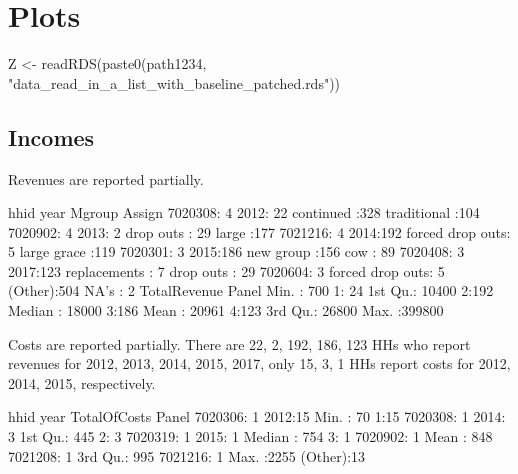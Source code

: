 \section{Plots}

\begin{Schunk}
\begin{Sinput}
Z <- readRDS(paste0(path1234, "data_read_in_a_list_with_baseline_patched.rds"))
\end{Sinput}
\end{Schunk}

\subsection{Incomes}



Revenues are reported partially.
\begin{Schunk}
\begin{Soutput}
      hhid       year                  Mgroup                 Assign   
 7020308:  4   2012: 22   continued       :328   traditional     :104  
 7020902:  4   2013:  2   drop outs       : 29   large           :177  
 7021216:  4   2014:192   forced drop outs:  5   large grace     :119  
 7020301:  3   2015:186   new group       :156   cow             : 89  
 7020408:  3   2017:123   replacements    :  7   drop outs       : 29  
 7020604:  3                                     forced drop outs:  5  
 (Other):504                                     NA's            :  2  
  TotalRevenue    Panel  
 Min.   :   700   1: 24  
 1st Qu.: 10400   2:192  
 Median : 18000   3:186  
 Mean   : 20961   4:123  
 3rd Qu.: 26800          
 Max.   :399800          
                         
\end{Soutput}
\end{Schunk}
Costs are reported partially. There are 22, 2, 192, 186, 123 HHs who report revenues for 2012, 2013, 2014, 2015, 2017, only 15, 3, 1 HHs report costs for 2012, 2014, 2015, respectively.
\begin{Schunk}
\begin{Soutput}
      hhid      year     TotalOfCosts  Panel 
 7020306: 1   2012:15   Min.   :  70   1:15  
 7020308: 1   2014: 3   1st Qu.: 445   2: 3  
 7020319: 1   2015: 1   Median : 754   3: 1  
 7020902: 1             Mean   : 848         
 7021208: 1             3rd Qu.: 995         
 7021216: 1             Max.   :2255         
 (Other):13                                  
\end{Soutput}
\end{Schunk}

